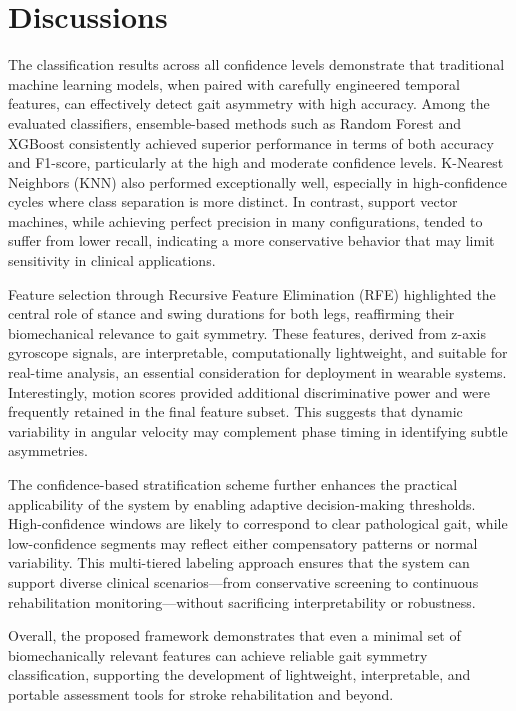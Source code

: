 \section{Discussions}
\label{sec:discussions}
The classification results across all confidence levels demonstrate that traditional machine learning models, when paired with carefully engineered temporal features, 
can effectively detect gait asymmetry with high accuracy. Among the evaluated classifiers, ensemble-based methods such as Random Forest and XGBoost consistently achieved 
superior performance in terms of both accuracy and F1-score, particularly at the high and moderate confidence levels. K-Nearest Neighbors (KNN) also performed 
exceptionally well, especially in high-confidence cycles where class separation is more distinct. In contrast, support vector machines, while achieving perfect 
precision in many configurations, tended to suffer from lower recall, indicating a more conservative behavior that may limit sensitivity in clinical applications.

Feature selection through Recursive Feature Elimination (RFE) highlighted the central role of stance and swing durations for both legs, reaffirming their biomechanical 
relevance to gait symmetry. These features, derived from z-axis gyroscope signals, are interpretable, computationally lightweight, and suitable for real-time 
analysis, an essential consideration for deployment in wearable systems. Interestingly, motion scores provided additional discriminative power and were frequently 
retained in the final feature subset. This suggests that dynamic variability in angular velocity may complement phase timing in identifying subtle asymmetries.

The confidence-based stratification scheme further enhances the practical applicability of the system by enabling adaptive decision-making thresholds. 
High-confidence windows are likely to correspond to clear pathological gait, while low-confidence segments may reflect either compensatory patterns or normal 
variability. This multi-tiered labeling approach ensures that the system can support diverse clinical scenarios—from conservative screening to continuous 
rehabilitation monitoring—without sacrificing interpretability or robustness.

Overall, the proposed framework demonstrates that even a minimal set of biomechanically relevant features can achieve reliable gait symmetry classification, 
supporting the development of lightweight, interpretable, and portable assessment tools for stroke rehabilitation and beyond.